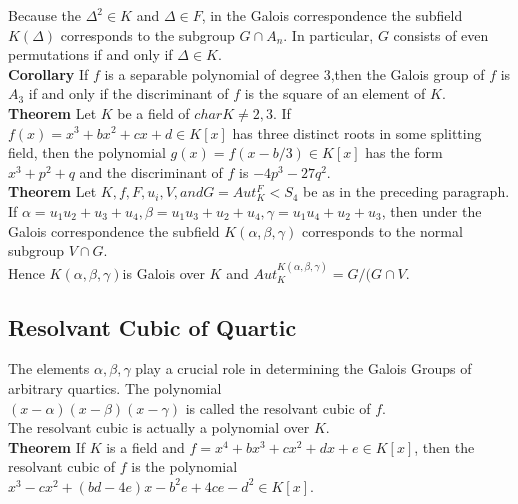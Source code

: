 Because the \({\Delta}^2 \in K\) and \(\Delta \in F\), in the Galois correspondence the subfield \(K(\Delta)\) corresponds to the subgroup \(G \cap A_n\). In particular, \(G\) consists of even permutations if and only if \(\Delta \in K\).\\[3mm]

\textbf{Corollary} \hspace{3mm} If \(f\) is a separable polynomial of degree \(3\),then the Galois group of \(f\) is \(A_3\) if and only if the discriminant of \(f\) is the square of an element of \(K\).\\[3mm]

\textbf{Theorem} \hspace{3mm} Let \(K\) be a field of \(char K \neq 2,3 \). If \(f(x)=x^3+bx^2+cx+d \in K[x]\) has three distinct roots in some splitting field, then the polynomial \(g(x)=f(x-b/3) \in K[x]\) has the form \(x^3+p^2+q\) and the discriminant of \(f\) is \(-4p^3-27q^2\).\\[3mm]

\textbf{Theorem} \hspace{3mm} Let \(K, f, F, u_i, V, and G=Aut_K^F<S_4\) be as in the preceding paragraph.\\
If \(\alpha=u_1u_2+u_3+u_4, \beta=u_1u_3+u_2+u_4, \gamma=u_1u_4+u_2+u_3\), then under the Galois correspondence the subfield \(K(\alpha, \beta, \gamma)\) corresponds to the normal subgroup \(V \cap G\).\\
Hence \(K(\alpha, \beta, \gamma)\)is Galois over \(K\) and \(Aut_K^{K(\alpha, \beta, \gamma)} = G/(G \cap V\).


\subsection{Resolvant Cubic of Quartic}
The elements \(\alpha, \beta, \gamma\) play a crucial role in determining the Galois Groups of arbitrary quartics. The polynomial \\
\( (x- \alpha)(x- \beta)(x- \gamma) \) is called the resolvant cubic of \(f\).\\
The resolvant cubic is actually a polynomial over \(K\).\\[3mm]

\textbf{Theorem} \hspace{3mm} If \(K\) is a field and \(f = x^4+bx^3+cx^2+dx+e \in K[x]\), then the resolvant cubic of \(f\) is the polynomial \(x^3-cx^2+(bd-4e)x-b^2e+4ce-d^2 \in K[x]\).\\[3mm]

